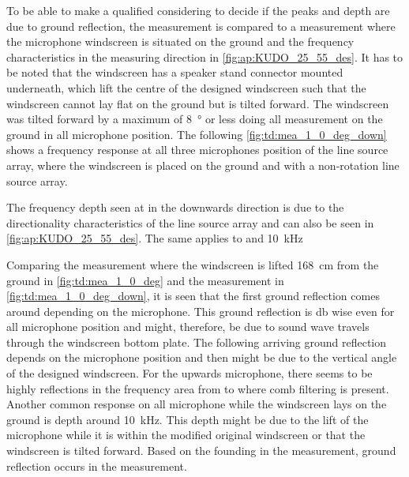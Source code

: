 

To be able to make a qualified considering to decide if the peaks and depth are due to ground reflection, the measurement is compared to a measurement where the microphone windscreen is situated on the ground and the frequency characteristics in the measuring direction in \autoref{fig:ap:KUDO_25_55_des}.  It has to be noted that the windscreen has a speaker stand connector mounted underneath, which lift the centre of the designed windscreen such that the windscreen cannot lay flat on the ground but is tilted forward. The windscreen was tilted forward by a maximum of \SI{8}{\degree} or less doing all measurement on the ground in all microphone position. The following \autoref{fig:td:mea_1_0_deg_down} shows a frequency response at all three microphones position of the line source array, where the windscreen is placed on the ground and with a non-rotation line source array.


The frequency depth seen at  in the downwards direction is due to the directionality characteristics of the line source array and can also be seen in \autoref{fig:ap:KUDO_25_55_des}. The same applies to  and \SI{10}{\kilo\hertz}

Comparing the measurement where the windscreen is lifted \SI{168}{\centi\meter} from the ground in \autoref{fig:td:mea_1_0_deg} and the measurement in \autoref{fig:td:mea_1_0_deg_down}, it is seen that the first ground reflection comes around  depending on the microphone. This ground reflection is \si{\decibel} wise even for all microphone position and might, therefore, be due to sound wave travels through the windscreen bottom plate. The following arriving ground reflection depends on the microphone position and then might be due to the vertical angle of the designed windscreen. For the upwards microphone, there seems to be highly reflections in the frequency area from  to  where comb filtering is present. 
Another common response on all microphone while the windscreen lays on the ground is depth around \SI{10}{\kilo\hertz}. This depth might be due to the lift of the microphone while it is within the modified original windscreen or that the windscreen is tilted forward. Based on the founding in the measurement, ground reflection occurs in the measurement.


